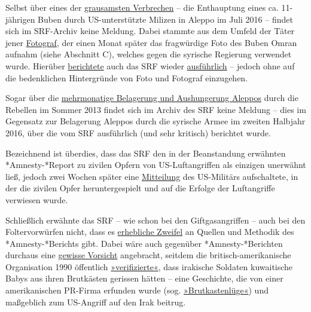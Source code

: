 Selbst über eines der
\href{http://www.dailymail.co.uk/news/article-3697770/US-backed-Nour-al-Din-al-Zenki-behead-boy-accused-al-Quds-spy-Assad.html}{grausamsten
Verbrechen} -- die Enthauptung eines ca. 11-jährigen Buben durch
US-unterstützte Milizen in Aleppo im Juli 2016 -- findet sich im
SRF-Archiv keine Meldung. Dabei stammte aus dem Umfeld der Täter jener
\href{http://21stcenturywire.com/2017/01/28/child-beheading-terrorist-supporter-wins-getty-and-sunday-times-defining-images-award-2016/}{Fotograf},
der einen Monat später das fragwürdige Foto des Buben Omran aufnahm
(siehe Abschnitt C), welches gegen die syrische Regierung verwendet
wurde. Hierüber
\href{http://www.srf.ch/news/international/dieses-kind-hatte-keine-ahnung-was-mit-ihm-geschah}{berichtete}
auch das SRF wieder
\href{http://www.srf.ch/news/international/ikrk-praesident-maurer-das-ist-die-realitaet-in-syrien}{ausführlich}
-- jedoch ohne auf die bedenklichen Hintergründe von Foto und Fotograf
einzugehen.

Sogar über die
\href{http://www.thealeppoproject.com/aleppo-conflict-timeline-2013/}{mehrmonatige
Belagerung und Aushungerung Aleppos} durch die Rebellen im Sommer 2013
findet sich im Archiv des SRF keine Meldung -- dies im Gegensatz zur
Belagerung Aleppos durch die syrische Armee im zweiten Halbjahr 2016,
über die vom SRF ausführlich (und sehr kritisch) berichtet wurde.

Bezeichnend ist überdies, dass das SRF den in der Beanstandung erwähnten
*Amnesty-*Report zu zivilen Opfern von US-Luftangriffen als einzigen
unerwähnt ließ, jedoch zwei Wochen später eine
\href{http://m.srf.ch/news/international/900-is-kaempfer-seit-beginn-der-mossul-offensive-getoetet}{Mitteilung}
des US-Militärs aufschaltete, in der die zivilen Opfer heruntergespielt
und auf die Erfolge der Luftangriffe verwiesen wurde.

Schließlich erwähnte das SRF -- wie schon bei den Giftgasangriffen --
auch bei den Foltervorwürfen nicht, dass es
\href{https://consortiumnews.com/2017/02/11/amnesty-international-stokes-syrian-war/}{erhebliche
Zweifel} an Quellen und Methodik des *Amnesty-*Berichts gibt. Dabei wäre
auch gegenüber *Amnesty-*Berichten durchaus eine
\href{https://consortiumnews.com/2017/02/11/amnesty-international-stokes-syrian-war/}{gewisse
Vorsicht} angebracht, seitdem die britisch-amerikanische Organisation
1990 öffentlich
\href{https://en.wikipedia.org/wiki/Nayirah_\%28testimony\%29}{»verifizierte«},
dass irakische Soldaten kuwaitische Babys aus ihren Brutkästen gerissen
hätten -- eine Geschichte, die von einer amerikanischen PR-Firma
erfunden wurde (sog.
\href{https://de.wikipedia.org/wiki/Brutkastenl\%C3\%BCge}{»Brutkastenlüge«})
und maßgeblich zum US-Angriff auf den Irak beitrug.

